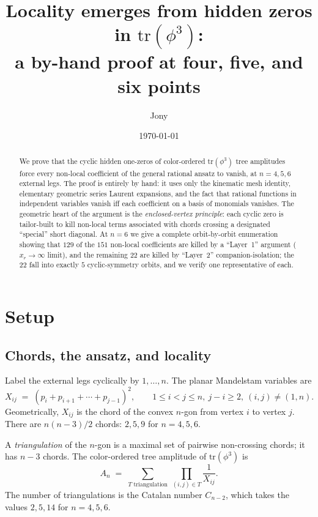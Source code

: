 \documentclass[11pt]{article}
\title{Locality emerges from hidden zeros in \texorpdfstring{$\mathrm{tr}(\phi^3)$}{tr(phi^3)}:\\
a by-hand proof at four, five, and six points}
\author{Jony}
\date{\today}
\newcommand{\X}[2]{X_{#1#2}}
\theoremstyle{definition}
\begin{document}
\maketitle

\begin{abstract}
We prove that the cyclic hidden one-zeros of color-ordered $\mathrm{tr}(\phi^3)$
tree amplitudes force every non-local coefficient of the general rational
ansatz to vanish, at $n=4, 5, 6$ external legs. The proof is entirely by
hand: it uses only the kinematic mesh identity, elementary geometric series
Laurent expansions, and the fact that rational functions in independent
variables vanish iff each coefficient on a basis of monomials vanishes.
The geometric heart of the argument is the \emph{enclosed-vertex principle}:
each cyclic zero is tailor-built to kill non-local terms associated with
chords crossing a designated ``special'' short diagonal. At $n=6$ we give a
complete orbit-by-orbit enumeration showing that $129$ of the $151$ non-local
coefficients are killed by a ``Layer~1'' argument ($x_r \to \infty$ limit),
and the remaining $22$ are killed by ``Layer~2'' companion-isolation; the
$22$ fall into exactly $5$ cyclic-symmetry orbits, and we verify one
representative of each.
\end{abstract}

\tableofcontents

\section{Setup}

\subsection{Chords, the ansatz, and locality}

Label the external legs cyclically by $1,\ldots,n$. The planar Mandelstam
variables are
\[
\X{i}{j} \;=\; (p_i+p_{i+1}+\cdots+p_{j-1})^2,\qquad 1\le i<j\le n,\ j-i\ge 2,\ (i,j)\ne(1,n).
\]
Geometrically, $\X{i}{j}$ is the chord of the convex $n$-gon from vertex $i$
to vertex $j$. There are $n(n-3)/2$ chords: $2, 5, 9$ for $n=4,5,6$.

A \emph{triangulation} of the $n$-gon is a maximal set of pairwise
non-crossing chords; it has $n-3$ chords. The color-ordered tree amplitude
of $\mathrm{tr}(\phi^3)$ is
\[
A_n \;=\;\sum_{T\text{ triangulation}}\ \prod_{(i,j)\in T}\frac{1}{\X{i}{j}}.
\]
The number of triangulations is the Catalan number $C_{n-2}$, which takes
the values $2, 5, 14$ for $n=4, 5, 6$.
\end{document}
